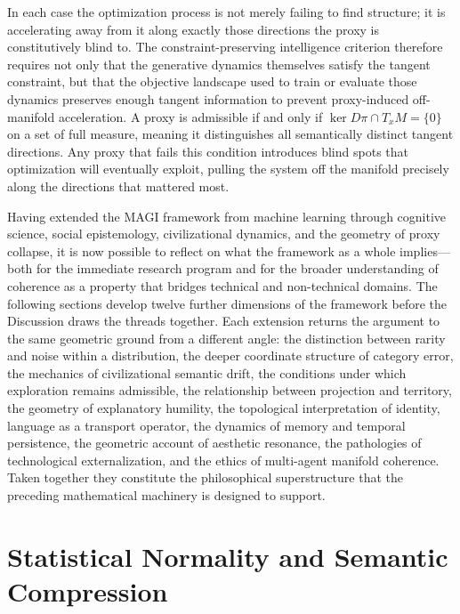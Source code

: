 \documentclass[11pt,a4paper,twocolumn]{article}
\begin{document}
In each case the optimization process is not merely failing
to find structure; it is accelerating away from it along
exactly those directions the proxy is constitutively blind
to. The constraint-preserving intelligence criterion
therefore requires not only that the generative dynamics
themselves satisfy the tangent constraint, but that the
objective landscape used to train or evaluate those dynamics
preserves enough tangent information to prevent proxy-induced
off-manifold acceleration. A proxy is admissible if and only
if $\ker D\pi \cap T_x M = \{0\}$ on a set of full measure,
meaning it distinguishes all semantically distinct tangent
directions. Any proxy that fails this condition introduces
blind spots that optimization will eventually exploit, pulling
the system off the manifold precisely along the directions
that mattered most.

Having extended the MAGI framework from machine learning
through cognitive science, social epistemology, civilizational
dynamics, and the geometry of proxy collapse, it is now
possible to reflect on what the framework as a whole
implies---both for the immediate research program and for the
broader understanding of coherence as a property that bridges
technical and non-technical domains. The following sections
develop twelve further dimensions of the framework before
the Discussion draws the threads together. Each extension
returns the argument to the same geometric ground from a
different angle: the distinction between rarity and noise
within a distribution, the deeper coordinate structure of
category error, the mechanics of civilizational semantic
drift, the conditions under which exploration remains
admissible, the relationship between projection and
territory, the geometry of explanatory humility, the
topological interpretation of identity, language as a
transport operator, the dynamics of memory and temporal
persistence, the geometric account of aesthetic resonance,
the pathologies of technological externalization, and
the ethics of multi-agent manifold coherence. Taken
together they constitute the philosophical superstructure
that the preceding mathematical machinery is designed to
support.


\section{Statistical Normality and Semantic Compression}
\end{document}
